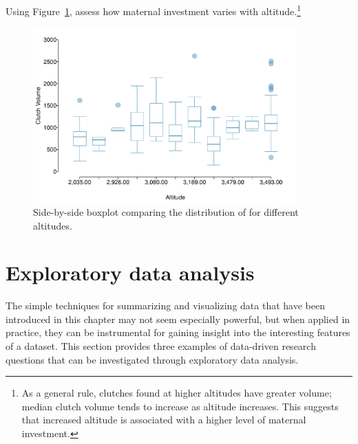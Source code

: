 

\begin{exercise} Using Figure~\ref{frogClutchVolAlt}, assess how maternal investment varies with altitude.\footnote{As a general rule, clutches found at higher altitudes have greater volume; median clutch volume tends to increase as altitude increases. This suggests that increased altitude is associated with a higher level of maternal investment.}
	
\begin{figure}[h!]
	\centering
	\includegraphics[width=0.9\textwidth]{ch_intro_to_data_oi_biostat/figures/frogClutchVolAlt/frogClutchVolAlt}
	\caption{Side-by-side boxplot comparing the distribution of  for different altitudes.}
	\label{frogClutchVolAlt}
\end{figure} 
	
\end{exercise}


\section[Exploratory data analysis]{Exploratory data analysis}
\label{exploratoryDataAnalysis}

The simple techniques for summarizing and visualizing data that have been introduced in this chapter may not seem especially powerful, but when applied in practice, they can be instrumental for gaining insight into the interesting features of a dataset. This section provides three examples of data-driven research questions that can be investigated through exploratory data analysis.

